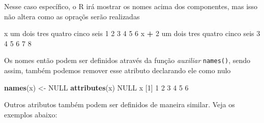 \documentclass[10pt,a4paper]{book}
\newenvironment{Shaded}{\begin{snugshade}}{\end{snugshade}}
\newcommand{\KeywordTok}[1]{\textcolor[rgb]{0.13,0.29,0.53}{\textbf{#1}}}
\newcommand{\DecValTok}[1]{\textcolor[rgb]{0.00,0.00,0.81}{#1}}
\newcommand{\StringTok}[1]{\textcolor[rgb]{0.31,0.60,0.02}{#1}}
\newcommand{\OtherTok}[1]{\textcolor[rgb]{0.56,0.35,0.01}{#1}}
\newcommand{\OperatorTok}[1]{\textcolor[rgb]{0.81,0.36,0.00}{\textbf{#1}}}
\newcommand{\NormalTok}[1]{#1}
\begin{document}
Nesse caso específico, o R irá mostrar os nomes acima dos componentes,
mas isso não altera como as opraçõs serão realizadas

\begin{Shaded}
\begin{Highlighting}[]
\NormalTok{x}
\NormalTok{    um   dois   tres quatro  cinco   seis }
     \DecValTok{1}      \DecValTok{2}      \DecValTok{3}      \DecValTok{4}      \DecValTok{5}      \DecValTok{6} 
\NormalTok{x }\OperatorTok{+}\StringTok{ }\DecValTok{2}
\NormalTok{    um   dois   tres quatro  cinco   seis }
     \DecValTok{3}      \DecValTok{4}      \DecValTok{5}      \DecValTok{6}      \DecValTok{7}      \DecValTok{8} 
\end{Highlighting}
\end{Shaded}

Os nomes então podem ser definidos através da função \emph{auxiliar}
\texttt{names()}, sendo assim, também podemos remover esse atributo
declarando ele como nulo

\begin{Shaded}
\begin{Highlighting}[]
\KeywordTok{names}\NormalTok{(x) <-}\StringTok{ }\OtherTok{NULL}
\KeywordTok{attributes}\NormalTok{(x)}
\OtherTok{NULL}
\NormalTok{x}
\NormalTok{[}\DecValTok{1}\NormalTok{] }\DecValTok{1} \DecValTok{2} \DecValTok{3} \DecValTok{4} \DecValTok{5} \DecValTok{6}
\end{Highlighting}
\end{Shaded}

Outros atributos também podem ser definidos de maneira similar. Veja os
exemplos abaixo:

\begin{Shaded}
\end{Shaded}
\end{document}
